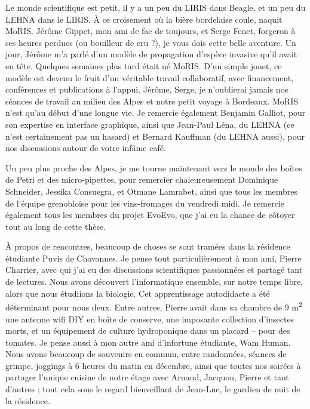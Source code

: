 Le monde scientifique est petit, il y a un peu du LIRIS dans Beagle, et un peu du LEHNA dans le LIRIS. \`A ce croisement o\`u la bi\`ere bordelaise coule, naquit MoRIS. J\'er\^ome Gippet, mon ami de fac de toujours, et Serge Fenet, forgeron \`a ses heures perdues (ou bouilleur de cru ?), je vous dois cette belle aventure.
Un jour, J\'er\^ome m'a parl\'e d'un mod\`ele de propagation d'esp\`ece invasive qu'il avait en t\^ete. Quelques semaines plus tard \'etait n\'e MoRIS. D'un simple jouet, ce mod\`ele est devenu le fruit d'un v\'eritable travail collaboratif, avec financement, conf\'erences et publications \`a l'appui. J\'er\^ome, Serge, je n'oublierai jamais nos s\'eances de travail au milieu des Alpes et notre petit voyage \`a Bordeaux. MoRIS n'est qu'au d\'ebut d'une longue vie. Je remercie \'egalement Benjamin Galliot, pour son expertise en interface graphique, ainsi que Jean-Paul L\'ena, du LEHNA (ce n'est certainement pas un hasard) et Bernard Kauffman (du LEHNA aussi), pour nos discussions autour de votre inf\^ame caf\'e.

Un peu plus proche des Alpes, je me tourne maintenant vers le monde des bo\^ites de Petri et des micro-pipettes, pour remercier chaleureusement Dominique Schneider, Jessika Consuegra, et Otmane Lamrabet, ainsi que tous les membres de l'\'equipe grenobloise pour les vins-fromages du vendredi midi. Je remercie \'egalement tous les membres du projet EvoEvo, que j'ai eu la chance de c\^otoyer tout au long de cette th\`ese.

\`A propos de rencontres, beaucoup de choses se sont tram\'ees dans la r\'esidence \'etudiante Puvis de Chavannes. Je pense tout particuli\`erement \`a mon ami, Pierre Charrier, avec qui j'ai eu des discussions scientifiques passionn\'ees et partag\'e tant de lectures. Nous avons d\'ecouvert l'informatique ensemble, sur notre temps libre, alors que nous \'etudiions la biologie. Cet apprentissage autodidacte a \'et\'e d\'eterminant pour nous deux. Entre autres, Pierre avait dans sa chambre de 9 m\textsuperscript{2} une antenne wifi DIY en bo\^ite de conserve, une imposante collection d'insectes morts, et un \'equipement de culture hydroponique dans un placard -- pour des tomates.
Je pense aussi \`a mon autre ami d'infortune \'etudiante, Wam Human. Nous avons beaucoup de souvenirs en commun, entre randonn\'ees, s\'eances de grimpe, joggings \`a 6 heures du matin en d\'ecembre, ainsi que toutes nos soir\'ees \`a partager l'unique cuisine de notre \'etage avec Arnaud, Jacquou, Pierre et tant d'autres ; tout cela sous le regard bienveillant de Jean-Luc, le gardien de nuit de la r\'esidence.

